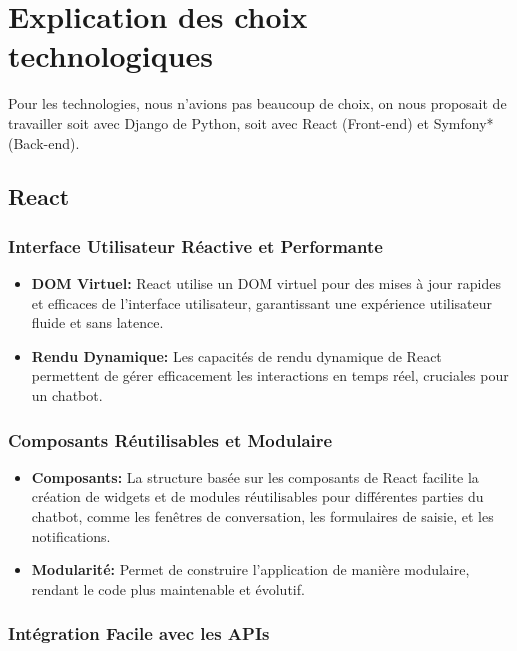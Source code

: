 \section{Explication des choix technologiques}

\hspace{16pt}Pour les technologies, nous n'avions pas beaucoup de choix, on nous proposait de travailler soit avec Django de Python, soit avec React (Front-end) et Symfony* (Back-end).

\subsection{React}


\subsubsection{Interface Utilisateur Réactive et Performante}

\begin{itemize}
  \item \textbf{DOM Virtuel: }React utilise un DOM virtuel pour des mises à jour rapides et efficaces de l'interface utilisateur, garantissant une expérience utilisateur fluide et sans latence.
  \item \textbf{Rendu Dynamique: }Les capacités de rendu dynamique de React permettent de gérer efficacement les interactions en temps réel, cruciales pour un chatbot.
\end{itemize}

\subsubsection{Composants Réutilisables et Modulaire}

\begin{itemize}
  \item \textbf{Composants: }La structure basée sur les composants de React facilite la création de widgets et de modules réutilisables pour différentes parties du chatbot, comme les fenêtres de conversation, les formulaires de saisie, et les notifications.
  \item \textbf{Modularité: }Permet de construire l'application de manière modulaire, rendant le code plus maintenable et évolutif.
\end{itemize}

\subsubsection{Intégration Facile avec les APIs}

